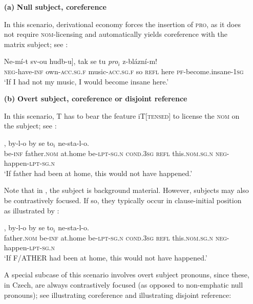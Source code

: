\documentclass[output=paper,colorlinks,citecolor=brown,
modfonts,newtxmath
]{langscibook}
\begin{document}
\begin{itemize}
\item[\textbf{(a)}] \textbf{Null subject, coreference}

In this scenario, derivational economy forces the insertion of \textsc{pro}, as it does not require \textsc{nom}-licensing and automatically yields coreference with the matrix subject; see :

\ea\label{ex:music3}
\gll {[\textsc{pro}$_i$} Ne-mí-t sv-ou hudb-u], tak se tu {\textit{pro}$_i$} z-blázní-m!\\
     {} \textsc{neg}-have-\textsc{inf} own-\textsc{acc.sg.f} music-\textsc{acc.sg.f} so \textsc{refl} here {} \textsc{pf}-{become.insane}-\textsc{1sg}\\
\glt `If I had not my music, I would become insane here.'
\z


\item[\textbf{(b)}] \textbf{Overt subject, coreference or disjoint reference}

In this scenario, T has to bear the feature iT[\textsc{tensed}] to license the \textsc{nom} on the subject; see :

\ea\label{ex:father3}
, by-l-o by se to$_i$ ne-sta-l-o.\\
     {} be-\textsc{inf} father.\textsc{nom} {at.home} be-\textsc{lpt-sg.n} \textsc{cond.3sg} \textsc{refl} this.\textsc{nom.sg.n} \textsc{neg}-happen-\textsc{lpt-sg.n}\\
\glt `If father had been at home, this would not have happened.'
\z

\noindent Note that in , the subject is background material. However, subjects may also be contrastively focused. If so, they typically occur in clause-initial position as illustrated by :

\ea\label{ex:father4}
, by-l-o by se to$_i$ ne-sta-l-o.\\
     {} father.\textsc{nom} be-\textsc{inf} {at.home} be-\textsc{lpt-sg.n} \textsc{cond.3sg} \textsc{refl} this.\textsc{nom.sg.n} \textsc{neg}-happen-\textsc{lpt-sg.n}\\
\glt `If F/ATHER had been at home, this would not have happened.'
\z

\noindent A special subcase of this scenario involves overt subject pronouns, since these, in Czech, are always contrastively focused (as opposed to non-emphatic null pronouns); see  illustrating coreference and  illustrating disjoint reference:


\end{itemize}
\end{document}
